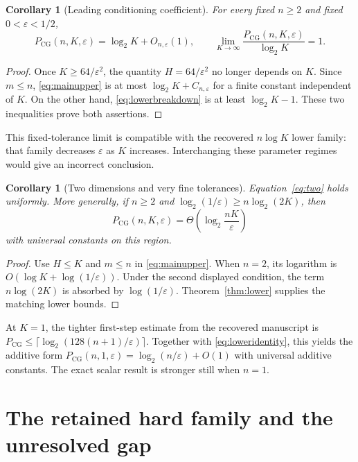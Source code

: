 \documentclass[11pt]{article}
\newtheorem{corollary}[theorem]{Corollary}
\theoremstyle{remark}\newtheorem{remark}[theorem]{Remark}
\newcommand{\PCG}{P_{\mathrm{CG}}}
\newcommand{\eps}{\varepsilon}
\begin{document}
\begin{corollary}[Leading conditioning coefficient]\label{cor:largeK}
For every fixed $n\ge2$ and fixed $0<\eps<1/2$,
\[
\PCG(n,K,\eps)=\log_2K+O_{n,\eps}(1),\qquad
\lim_{K\to\infty}\frac{\PCG(n,K,\eps)}{\log_2K}=1.
\]
\end{corollary}
\begin{proof}
Once $K\ge64/\eps^2$, the quantity $H=64/\eps^2$ no longer depends
on $K$. Since $m\le n$, \eqref{eq:mainupper} is at most
$\log_2K+C_{n,\eps}$ for a finite constant independent of $K$.
On the other hand, \eqref{eq:lowerbreakdown} is at least
$\log_2K-1$. These two inequalities prove both assertions.
\end{proof}

This fixed-tolerance limit is compatible with the recovered
$n\log K$ lower family: that family decreases $\eps$ as $K$ increases.
Interchanging these parameter regimes would give an incorrect conclusion.

\begin{corollary}[Two dimensions and very fine tolerances]\label{cor:two}
Equation~\eqref{eq:two} holds uniformly. More generally, if $n\ge2$ and
$\log_2(1/\eps)\ge n\log_2(2K)$, then
\[
\PCG(n,K,\eps)=\Theta\!\left(\log_2\frac{nK}{\eps}\right)
\]
with universal constants on this region.
\end{corollary}
\begin{proof}
Use $H\le K$ and $m\le n$ in \eqref{eq:mainupper}.
When $n=2$, its logarithm is $O(\log K+\log(1/\eps))$.
Under the second displayed condition, the term $n\log(2K)$ is
absorbed by $\log(1/\eps)$. Theorem~\ref{thm:lower} supplies the
matching lower bounds.
\end{proof}

At $K=1$, the tighter first-step estimate from the recovered manuscript
is $\PCG\le\lceil\log_2(128(n+1)/\eps)\rceil$.
Together with \eqref{eq:loweridentity}, this yields the additive form
$\PCG(n,1,\eps)=\log_2(n/\eps)+O(1)$ with universal additive constants.
The exact scalar result is stronger still when $n=1$.

\section{The retained hard family and the unresolved gap}
\label{sec:gap}
\end{document}
